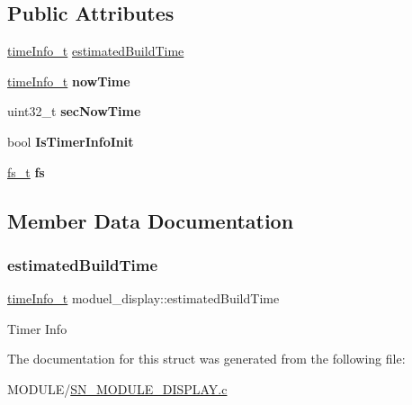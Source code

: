\subsection*{Public Attributes}
\begin{DoxyCompactItemize}
\item 
\hyperlink{structtime__display}{time\+Info\+\_\+t} \hyperlink{structmoduel__display_a9decd48cf98fa84f8719ccff9fb91a55}{estimated\+Build\+Time}
\item 
\mbox{\label{structmoduel__display_a831f22b21f13092957059964bf046b6e}} 
\hyperlink{structtime__display}{time\+Info\+\_\+t} {\bfseries now\+Time}
\item 
\mbox{\label{structmoduel__display_a5dbac85ab80f462614664903f2402d8f}} 
uint32\+\_\+t {\bfseries sec\+Now\+Time}
\item 
\mbox{\label{structmoduel__display_a3d292d8f441d6c2252186b13ed87d640}} 
bool {\bfseries Is\+Timer\+Info\+Init}
\item 
\mbox{\label{structmoduel__display_a19a1c8e3a87ffb0b9ecdaf1d94b5db18}} 
\hyperlink{structfile__system}{fs\+\_\+t} {\bfseries fs}
\end{DoxyCompactItemize}


\subsection{Member Data Documentation}
\mbox{\label{structmoduel__display_a9decd48cf98fa84f8719ccff9fb91a55}} 
\subsubsection{\texorpdfstring{estimated\+Build\+Time}{estimatedBuildTime}}
{\footnotesize\ttfamily \hyperlink{structtime__display}{time\+Info\+\_\+t} moduel\+\_\+display\+::estimated\+Build\+Time}

Timer Info 

The documentation for this struct was generated from the following file\+:\begin{DoxyCompactItemize}
\item 
M\+O\+D\+U\+L\+E/\hyperlink{SN__MODULE__DISPLAY_8c}{S\+N\+\_\+\+M\+O\+D\+U\+L\+E\+\_\+\+D\+I\+S\+P\+L\+A\+Y.\+c}\end{DoxyCompactItemize}
